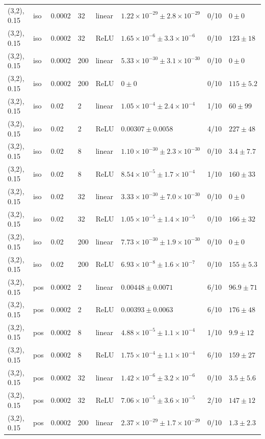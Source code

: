 \begin{table}[t]
\begin{tabular}{llllllll}
(3,2), 0.15 & iso & 0.0002 & 32 & linear & $1.22\times10^{-29}\pm2.8\times10^{-29}$ & 0/10 & $0\pm0$ \\
(3,2), 0.15 & iso & 0.0002 & 32 & ReLU & $1.65\times10^{-6}\pm3.3\times10^{-6}$ & 0/10 & $123\pm18$ \\
(3,2), 0.15 & iso & 0.0002 & 200 & linear & $5.33\times10^{-30}\pm3.1\times10^{-30}$ & 0/10 & $0\pm0$ \\
(3,2), 0.15 & iso & 0.0002 & 200 & ReLU & $0\pm0$ & 0/10 & $115\pm5.2$ \\
(3,2), 0.15 & iso & 0.02 & 2 & linear & $1.05\times10^{-4}\pm2.4\times10^{-4}$ & 1/10 & $60\pm99$ \\
(3,2), 0.15 & iso & 0.02 & 2 & ReLU & $0.00307\pm0.0058$ & 4/10 & $227\pm48$ \\
(3,2), 0.15 & iso & 0.02 & 8 & linear & $1.10\times10^{-30}\pm2.3\times10^{-30}$ & 0/10 & $3.4\pm7.7$ \\
(3,2), 0.15 & iso & 0.02 & 8 & ReLU & $8.54\times10^{-5}\pm1.7\times10^{-4}$ & 1/10 & $160\pm33$ \\
(3,2), 0.15 & iso & 0.02 & 32 & linear & $3.33\times10^{-30}\pm7.0\times10^{-30}$ & 0/10 & $0\pm0$ \\
(3,2), 0.15 & iso & 0.02 & 32 & ReLU & $1.05\times10^{-5}\pm1.4\times10^{-5}$ & 0/10 & $166\pm32$ \\
(3,2), 0.15 & iso & 0.02 & 200 & linear & $7.73\times10^{-30}\pm1.9\times10^{-30}$ & 0/10 & $0\pm0$ \\
(3,2), 0.15 & iso & 0.02 & 200 & ReLU & $6.93\times10^{-8}\pm1.6\times10^{-7}$ & 0/10 & $155\pm5.3$ \\
(3,2), 0.15 & pos & 0.0002 & 2 & linear & $0.00448\pm0.0071$ & 6/10 & $96.9\pm71$ \\
(3,2), 0.15 & pos & 0.0002 & 2 & ReLU & $0.00393\pm0.0063$ & 6/10 & $176\pm48$ \\
(3,2), 0.15 & pos & 0.0002 & 8 & linear & $4.88\times10^{-5}\pm1.1\times10^{-4}$ & 1/10 & $9.9\pm12$ \\
(3,2), 0.15 & pos & 0.0002 & 8 & ReLU & $1.75\times10^{-4}\pm1.1\times10^{-4}$ & 6/10 & $159\pm27$ \\
(3,2), 0.15 & pos & 0.0002 & 32 & linear & $1.42\times10^{-6}\pm3.2\times10^{-6}$ & 0/10 & $3.5\pm5.6$ \\
(3,2), 0.15 & pos & 0.0002 & 32 & ReLU & $7.06\times10^{-5}\pm3.6\times10^{-5}$ & 2/10 & $147\pm12$ \\
(3,2), 0.15 & pos & 0.0002 & 200 & linear & $2.37\times10^{-29}\pm1.7\times10^{-29}$ & 0/10 & $1.3\pm2.3$ \\

\end{tabular}
\end{table}
